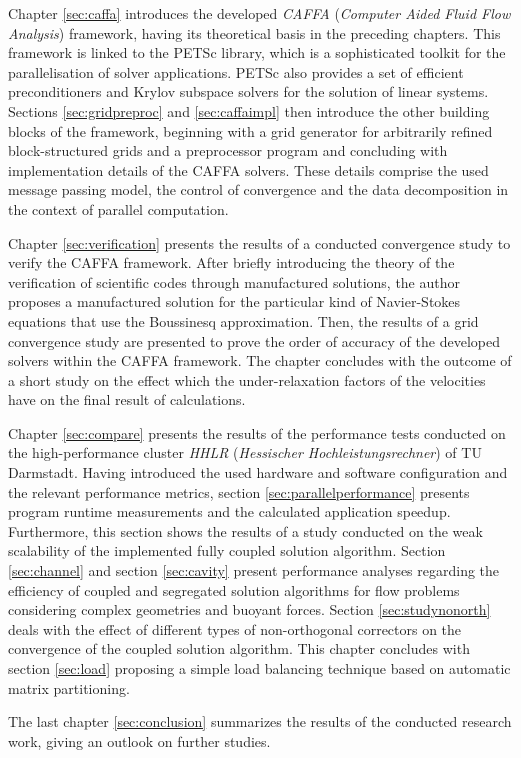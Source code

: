 Chapter \ref{sec:caffa} introduces the developed \emph{CAFFA} (\emph{Computer Aided Fluid Flow Analysis}) framework, having its theoretical basis in the preceding chapters. This framework is linked to the PETSc library, which is a sophisticated toolkit for the parallelisation of solver applications. PETSc also provides a set of efficient preconditioners and Krylov subspace solvers for the solution of linear systems. Sections \ref{sec:gridpreproc} and \ref{sec:caffaimpl} then introduce the other building blocks of the framework, beginning with a grid generator for arbitrarily refined block-structured grids and a preprocessor program and concluding with implementation details of the CAFFA solvers. These details comprise the used message passing model, the control of convergence and the data decomposition in the context of parallel computation.

Chapter \ref{sec:verification} presents the results of a conducted convergence study to verify the CAFFA framework. After briefly introducing the theory of the verification of scientific codes through manufactured solutions, the author proposes a manufactured solution for the particular kind of Navier-Stokes equations that use the Boussinesq approximation. Then, the results of a grid convergence study are presented to prove the order of accuracy of the developed solvers within the CAFFA framework. The chapter concludes with the outcome of a short study on the effect which the under-relaxation factors of the velocities have on the final result of calculations.

Chapter \ref{sec:compare} presents the results of the performance tests conducted on the high-performance cluster \emph{HHLR} (\emph{Hessischer Hochleistungsrechner}) of TU Darmstadt. Having introduced the used hardware and software configuration and the relevant performance metrics, section \ref{sec:parallelperformance} presents program runtime measurements and the calculated application speedup. Furthermore, this section shows the results of a study conducted on the weak scalability of the implemented fully coupled solution algorithm. Section \ref{sec:channel} and section \ref{sec:cavity} present performance analyses regarding the efficiency of coupled and segregated solution algorithms for flow problems considering complex geometries and buoyant forces. Section \ref{sec:studynonorth} deals with the effect of different types of non-orthogonal correctors on the convergence of the coupled solution algorithm. This chapter concludes with section \ref{sec:load} proposing a simple load balancing technique based on automatic matrix partitioning.

The last chapter \ref{sec:conclusion} summarizes the results of the conducted research work, giving an outlook on further studies.

